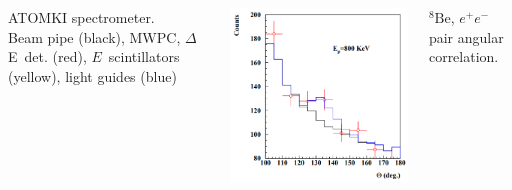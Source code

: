 \documentclass{beamer}
\begin{document}
\begin{frame}
\begin{itemize}
\begin{columns}
\begin{minipage}[t][4cm]{\textwidth}
					\end{minipage}
					\small{ATOMKI spectrometer.~\cite{atomki_det}}\\ \vspace{0.1cm}
					\tiny{Beam pipe (black), MWPC, $\Delta$E~det. (red), $E$~scintillators (yellow), light guides (blue)}
					\centering
					\begin{minipage}[t][4cm]{\textwidth}
						\centering
						\includegraphics[width=\textwidth]{../images/atomki_be.png}
					\end{minipage}
					\footnotesize{$ {}^8\text{Be} $, $e^{+}e^{-}$ pair angular correlation.~\cite{atomki_be}}
					\centering
					\begin{minipage}[t][4cm]{\textwidth}
						\centering

\end{minipage}
\end{columns}
\end{itemize}
\end{frame}
\end{document}
